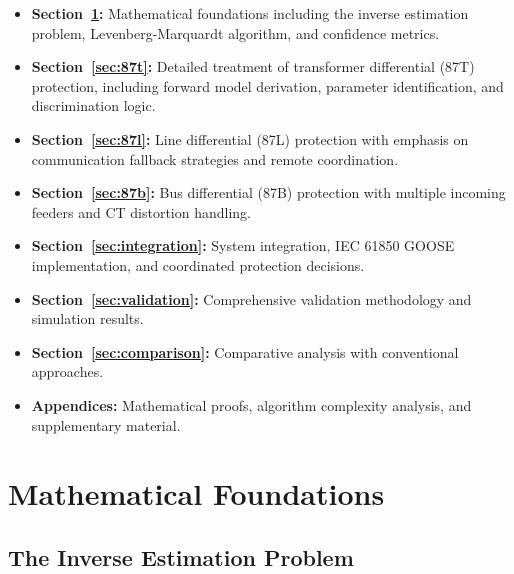 \documentclass[12pt,a4paper]{article}
\begin{document}
\begin{itemize}
    \item \textbf{Section~\ref{sec:math}:} Mathematical foundations including the 
    inverse estimation problem, Levenberg-Marquardt algorithm, and confidence metrics.
    
    \item \textbf{Section~\ref{sec:87t}:} Detailed treatment of transformer differential 
    (87T) protection, including forward model derivation, parameter identification, 
    and discrimination logic.
    
    \item \textbf{Section~\ref{sec:87l}:} Line differential (87L) protection with 
    emphasis on communication fallback strategies and remote coordination.
    
    \item \textbf{Section~\ref{sec:87b}:} Bus differential (87B) protection with 
    multiple incoming feeders and CT distortion handling.
    
    \item \textbf{Section~\ref{sec:integration}:} System integration, IEC 61850 GOOSE 
    implementation, and coordinated protection decisions.
    
    \item \textbf{Section~\ref{sec:validation}:} Comprehensive validation methodology 
    and simulation results.
    
    \item \textbf{Section~\ref{sec:comparison}:} Comparative analysis with conventional 
    approaches.
    
    \item \textbf{Appendices:} Mathematical proofs, algorithm complexity analysis, 
    and supplementary material.
\end{itemize}

\section{Mathematical Foundations}
\label{sec:math}

\subsection{The Inverse Estimation Problem}
\label{subsec:inverse_problem}
\end{document}
